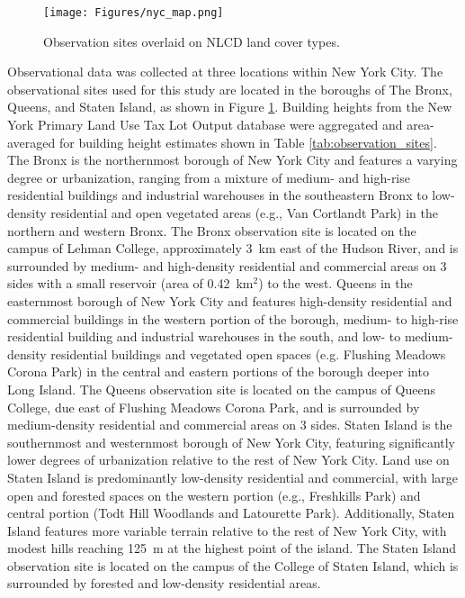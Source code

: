 \begin{figure}[ht]
	\centering
	\texttt{[image: Figures/nyc\_map.png]}
	\caption{Observation sites overlaid on NLCD land cover types.}
	\label{fig:nyc_map}
\end{figure}

Observational data was collected at three locations within New York City. The observational sites used for this study are located in the boroughs of The Bronx, Queens, and Staten Island, as shown in Figure \ref{fig:nyc_map}. Building heights from the New York  Primary Land Use Tax Lot Output database were aggregated and area-averaged for building height estimates shown in Table \ref{tab:observation_sites}. The Bronx is the northernmost borough of New York City and features a varying degree or urbanization, ranging from a mixture of medium- and high-rise residential buildings and industrial warehouses in the southeastern Bronx to low-density residential and open vegetated areas (e.g., Van Cortlandt Park) in the northern and western Bronx. The Bronx observation site is located on the campus of Lehman College, approximately \SI{3}{\kilo\meter} east of the Hudson River, and is surrounded by medium- and high-density residential and commercial areas on 3 sides with  a small reservoir (area of \SI{0.42}{\kilo\meter}$^2$) to the west. Queens in the easternmost borough of New York City and features high-density residential and commercial buildings in the western portion of the borough, medium- to high-rise residential building and industrial warehouses in the south, and low- to medium-density residential buildings and vegetated open spaces (e.g. Flushing Meadows Corona Park) in the central and eastern portions of the borough deeper into Long Island. The Queens observation site is located on the campus of Queens College, due east of Flushing Meadows Corona Park, and is surrounded by medium-density residential and commercial areas on 3 sides. Staten Island is the southernmost and westernmost borough of New York City, featuring significantly lower degrees of urbanization relative to the rest of New York City. Land use on Staten Island is predominantly low-density residential and commercial, with large open and forested spaces on the western portion (e.g., Freshkills Park) and central portion (Todt Hill Woodlands and Latourette Park). Additionally, Staten Island features more variable terrain relative to the rest of New York City, with modest hills reaching \SI{125}{\meter} at the highest point of the island. The Staten Island observation site is located on the campus of the College of Staten Island, which is surrounded by forested and low-density residential areas.

